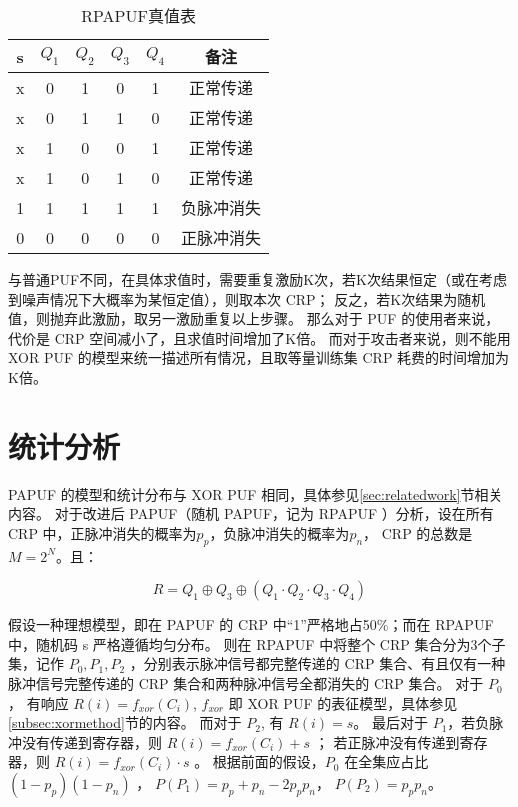 \begin{table}[h!]
\centering
\caption{RPAPUF真值表}
\label{tab:true-table-rpa}
\begin{tabular}{c|cccc|c}
\hline
s & $ Q_1 $ & $ Q_2 $ & $ Q_3 $ & $ Q_4 $ & 备注 \\
\hline
x & 0 & 1 & 0 & 1 & 正常传递\\
x & 0 & 1 & 1 & 0 & 正常传递\\
x & 1 & 0 & 0 & 1 & 正常传递\\
x & 1 & 0 & 1 & 0 & 正常传递\\
1 & 1 & 1 & 1 & 1 & 负脉冲消失\\
0 & 0 & 0 & 0 & 0 & 正脉冲消失\\
\hline
\end{tabular}
\end{table}

与普通PUF不同，在具体求值时，需要重复激励K次，若K次结果恒定（或在考虑到噪声情况下大概率为某恒定值），则取本次 CRP；
反之，若K次结果为随机值，则抛弃此激励，取另一激励重复以上步骤。
那么对于 PUF 的使用者来说，代价是 CRP 空间减小了，且求值时间增加了K倍。
而对于攻击者来说，则不能用 XOR PUF 的模型来统一描述所有情况，且取等量训练集 CRP 耗费的时间增加为K倍。

\section{统计分析}\label{sec:rpa_stat}
PAPUF 的模型和统计分布与 XOR PUF 相同，具体参见\ref{sec:relatedwork}节相关内容。
对于改进后 PAPUF（随机 PAPUF，记为 RPAPUF ）分析，设在所有 CRP 中，正脉冲消失的概率为$ p_p $，负脉冲消失的概率为$ p_n $， CRP 的总数是 $ M=2^N $。且：

\begin{equation}
R=Q_1\oplus Q_3\oplus (Q_1\cdot Q_2\cdot Q_3\cdot Q_4)
\end{equation}

假设一种理想模型，即在 PAPUF 的 CRP 中``1''严格地占50\%；而在 RPAPUF 中，随机码 s 严格遵循均匀分布。
则在 RPAPUF 中将整个 CRP 集合分为3个子集，记作 $ P_{0}, P_{1}, P_{2} $ ，分别表示脉冲信号都完整传递的 CRP 集合、有且仅有一种脉冲信号完整传递的 CRP 集合和两种脉冲信号全都消失的 CRP 集合。
对于 $ P_0 $， 有响应 $ R(i) = f_{xor}(C_i) $, $ f_{xor} $ 即 XOR PUF 的表征模型，具体参见\ref{subsec:xormethod}节的内容。
而对于 $ P_2 $, 有 $ R(i) = s $。
最后对于 $ P_1 $，若负脉冲没有传递到寄存器，则 $ R(i)= f_{xor}(C_i)+s $ ； 若正脉冲没有传递到寄存器，则 $ R(i)=f_{xor}(C_i)\cdot s $ 。
根据前面的假设，$ P_0 $ 在全集应占比 $ (1-p_p)(1-p_n) $ ， $ P(P_1)=p_p+p_n-2p_pp_n $， $ P(P_2)=p_pp_n $。

